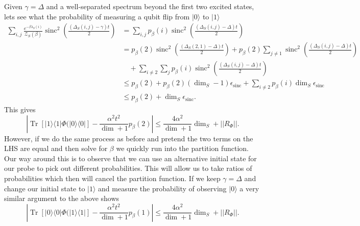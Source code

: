\documentclass{article}
\newcommand{\ket}[1]{|#1\rangle}
\newcommand{\ketbra}[2]{| #1\rangle\! \langle #2|}
\newcommand{\brackets}[1]{\left[ #1 \right]}
\newcommand{\norm}[1]{\left| \left| #1 \right| \right|}
\DeclareMathOperator{\Tr}{Tr}
\newcommand{\trace}[1]{\Tr \brackets{ #1 }}
\newcommand{\partfun}{\mathcal{Z}}
\DeclareMathOperator{\sinc}{sinc}
\begin{document}
Given $\gamma = \Delta$ and a well-separated spectrum beyond the first two excited states, lets see what the probability of measuring a qubit flip from $\ket{0}$ to $\ket{1}$
\begin{align}
    \sum_{i, j} \frac{e^{-\beta \lambda_S(i)}}{\partfun_S(\beta)} \sinc^2 \left( \frac{(\Delta_S(i, j) - \gamma) t}{2} \right) &= \sum_{i, j} p_{\beta}(i) \sinc^2 \left( \frac{(\Delta_S(i,j) - \Delta) t}{2} \right) \\
    &= p_{\beta}(2) \sinc^2 \left( \frac{(\Delta_S(2, 1) - \Delta) t}{2} \right) + p_{\beta}(2) \sum_{j \neq 1} \sinc^2 \left( \frac{(\Delta_S(i,j) - \Delta) t}{2} \right) \nonumber \\
    &\quad + \sum_{i \neq 2} \sum_{j} p_{\beta}(i) \sinc^2 \left( \frac{(\Delta_S(i,j) - \Delta) t}{2} \right) \\
    &\le p_{\beta}(2) + p_{\beta}(2) (\dim_S - 1) \epsilon_{\sinc} + \sum_{i \neq 2} p_{\beta}(i) \dim_S \epsilon_{\sinc} \\
    &\le p_{\beta}(2) + \dim_S \epsilon_{\sinc}.
\end{align}
This gives
\begin{equation}
    \left| \trace{\ketbra{1}{1} \Phi(\ketbra{0}{0}} - \frac{\alpha^2 t^2}{\dim + 1} p_{\beta}(2)\right| \leq \frac{4\alpha^2}{\dim + 1} \dim_S + \norm{R_{\Phi}}.
\end{equation}
However, if we do the same process as before and pretend the two terms on the LHS are equal and then solve for $\beta$ we quickly run into the partition function. Our way around this is to observe that we can use an alternative initial state for our probe to pick out different probabilities. This will allow us to take ratios of probabilities which then will cancel the partition function. If we keep $\gamma = \Delta$ and change our initial state to $\ket{1}$ and measure the probability of observing $\ket{0}$ a very similar argument to the above shows
\begin{equation}
    \left| \trace{\ketbra{0}{0} \Phi(\ketbra{1}{1}} - \frac{\alpha^2 t^2}{\dim + 1} p_{\beta}(1)\right| \leq \frac{4\alpha^2}{\dim + 1} \dim_S + \norm{R_{\Phi}}. 
\end{equation}
\end{document}
